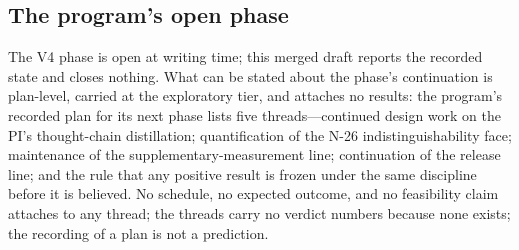 \documentclass[11pt]{article}
\begin{document}
\subsection{The program's open phase}
\noindent The V4 phase is open at writing time; this merged draft reports the recorded state and closes nothing. What can be stated about the phase's continuation is plan-level, carried at the exploratory tier, and attaches no results: the program's recorded plan for its next phase lists five threads—continued design work on the PI's thought-chain distillation; quantification of the N-26 indistinguishability face; maintenance of the supplementary-measurement line; continuation of the release line; and the rule that any positive result is frozen under the same discipline before it is believed. No schedule, no expected outcome, and no feasibility claim attaches to any thread; the threads carry no verdict numbers because none exists; the recording of a plan is not a prediction.\par
\end{document}
